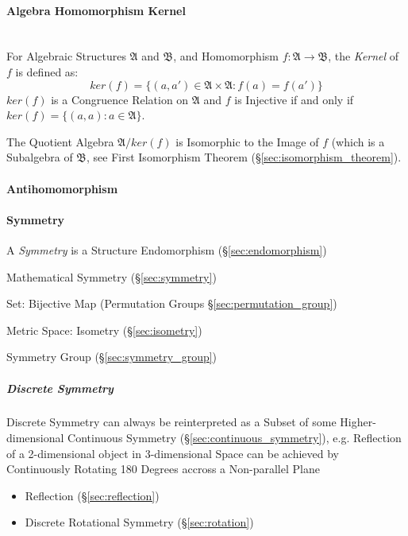 \paragraph{Algebra Homomorphism Kernel}\hfill
\label{sec:algebra_homomorphism_kernel} \hfill \\

For Algebraic Structures $\mathfrak{A}$ and $\mathfrak{B}$, and Homomorphism
$f: \mathfrak{A} \rightarrow \mathfrak{B}$, the \emph{Kernel} of $f$ is defined
as:
\[
    ker(f) = \{ (a,a') \in \mathfrak{A} \times \mathfrak{A} : f(a) = f(a') \}
\]
$ker(f)$ is a Congruence Relation on $\mathfrak{A}$ and $f$ is Injective if and
only if $ker(f) = \{(a,a) : a \in \mathfrak{A}\}$.

The Quotient Algebra $\mathfrak{A}/ker(f)$ is Isomorphic to the Image of $f$
(which is a Subalgebra of $\mathfrak{B}$, see First Isomorphism Theorem
(\S\ref{sec:isomorphism_theorem}).



\paragraph{Antihomomorphism}\label{sec:antihomomorphism}\hfill

\paragraph{Symmetry}\label{sec:structure_symmetry}\hfill

A \emph{Symmetry} is a Structure Endomorphism (\S\ref{sec:endomorphism})

Mathematical Symmetry (\S\ref{sec:symmetry})

Set: Bijective Map (Permutation Groups \S\ref{sec:permutation_group})

Metric Space: Isometry (\S\ref{sec:isometry})

Symmetry Group (\S\ref{sec:symmetry_group})



\subparagraph{Discrete Symmetry}\label{sec:discrete_symmetry}\hfill

Discrete Symmetry can always be reinterpreted as a Subset of some
Higher-dimensional Continuous Symmetry (\S\ref{sec:continuous_symmetry}), e.g.
Reflection of a 2-dimensional object in 3-dimensional Space can be achieved by
Continuously Rotating 180 Degrees accross a Non-parallel Plane

\begin{itemize}
  \item Reflection (\S\ref{sec:reflection})
  \item Discrete Rotational Symmetry (\S\ref{sec:rotation})
\end{itemize}



